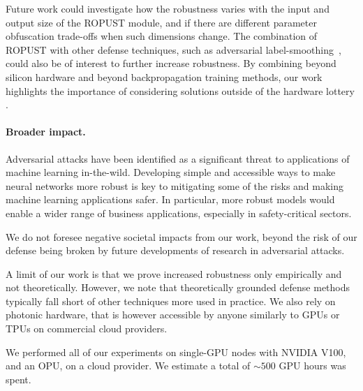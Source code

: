 Future work could investigate how the robustness varies with the input and output size of the ROPUST module, and if there are different parameter obfuscation trade-offs when such dimensions change. The combination of ROPUST with other defense techniques, such as adversarial label-smoothing~\cite{Goibert2019AdversarialRV}, could also be of interest to further increase robustness. By combining beyond silicon hardware and beyond backpropagation training methods, our work highlights the importance of considering solutions outside of the hardware lottery \cite{Hooker2020TheHL}. 

\paragraph{Broader impact.} Adversarial attacks have been identified as a significant threat to applications of machine learning in-the-wild. Developing simple and accessible ways to make neural networks more robust is key to mitigating some of the risks and making machine learning applications safer. In particular, more robust models would enable a wider range of business applications, especially in safety-critical sectors. 

We do not foresee negative societal impacts from our work, beyond the risk of our defense being broken by future developments of research in adversarial attacks.

A limit of our work is that we prove increased robustness only empirically and not theoretically. However, we note that theoretically grounded defense methods typically fall short of other techniques more used in practice. We also rely on photonic hardware, that is however accessible by anyone similarly to GPUs or TPUs on commercial cloud providers.

We performed all of our experiments on single-GPU nodes with NVIDIA V100, and an OPU, on a cloud provider. We estimate a total of $\sim 500$ GPU hours was spent.



% 
% 


